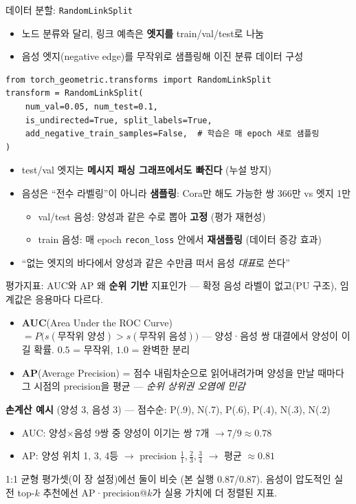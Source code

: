 \begin{frame}[fragile]{데이터 분할: \texttt{RandomLinkSplit}}
\begin{itemize}
  \item 노드 분류와 달리, 링크 예측은 \textbf{엣지를} train/val/test로 나눔
  \item 음성 엣지(negative edge)를 무작위로 샘플링해 이진 분류 데이터 구성
\end{itemize}
\begin{lstlisting}
from torch_geometric.transforms import RandomLinkSplit
transform = RandomLinkSplit(
    num_val=0.05, num_test=0.1,
    is_undirected=True, split_labels=True,
    add_negative_train_samples=False,  # 학습은 매 epoch 새로 샘플링
)
\end{lstlisting}
\begin{itemize}
  \small
  \item test/val 엣지는 \textbf{메시지 패싱 그래프에서도 빠진다} (누설 방지)
  \item 음성은 ``전수 라벨링''이 아니라 \textbf{샘플링}: Cora만 해도 가능한 쌍 366만 vs 엣지 1만
  \begin{itemize}
    \item val/test 음성: 양성과 같은 수로 뽑아 \textbf{고정} (평가 재현성)
    \item train 음성: 매 epoch \texttt{recon\_loss} 안에서 \textbf{재샘플링} (데이터 증강 효과)
  \end{itemize}
  \item ``없는 엣지의 바다에서 양성과 같은 수만큼 떠서 음성 \emph{대표}로 쓴다''
\end{itemize}
\end{frame}

\begin{frame}{평가지표: AUC와 AP}
\small
왜 \textbf{순위 기반} 지표인가 — 확정 음성 라벨이 없고(PU 구조), 임계값은 응용마다 다르다.
\begin{itemize}
  \item \textbf{AUC}(Area Under the ROC Curve) $= P\bigl(s(\text{무작위 양성}) > s(\text{무작위 음성})\bigr)$ — 양성·음성 쌍 대결에서 양성이 이길 확률. $0.5$ = 무작위, $1.0$ = 완벽한 분리
  \item \textbf{AP}(Average Precision) = 점수 내림차순으로 읽어내려가며 양성을 만날 때마다 그 시점의 precision을 평균 — \emph{순위 상위권 오염에 민감}
\end{itemize}
\vspace{0.3em}
\textbf{손계산 예시} (양성 3, 음성 3) — 점수순: P(.9), N(.7), P(.6), P(.4), N(.3), N(.2)
\begin{itemize}
  \item AUC: 양성$\times$음성 9쌍 중 양성이 이기는 쌍 7개 $\to 7/9 \approx 0.78$
  \item AP: 양성 위치 1, 3, 4등 $\to$ precision $\tfrac{1}{1}, \tfrac{2}{3}, \tfrac{3}{4}$ $\to$ 평균 $\approx 0.81$
\end{itemize}
\vspace{0.3em}
\footnotesize
1:1 균형 평가셋(이 장 설정)에선 둘이 비슷 (본 실행 0.87/0.87). 음성이 압도적인 실전 top-$k$ 추천에선 AP·precision@$k$가 실용 가치에 더 정렬된 지표.
\end{frame}

